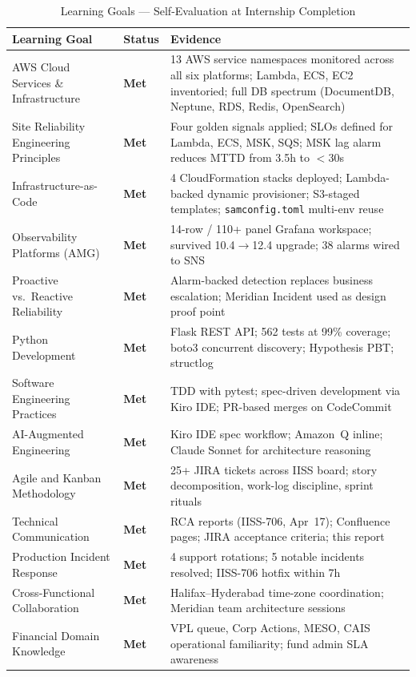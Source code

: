 \begin{table}[ht]
\centering
\caption{Learning Goals --- Self-Evaluation at Internship Completion}
\label{tab:learning_goals_eval}
\begin{tabular}{p{5.2cm}p{2.2cm}p{5.0cm}}
\toprule
\textbf{Learning Goal} & \textbf{Status} & \textbf{Evidence} \\
\midrule
AWS Cloud Services \& Infrastructure & \textcolor{smumaroon}{\textbf{Met}} & 13 AWS service namespaces monitored across all six platforms; Lambda, ECS, EC2 inventoried; full DB spectrum (DocumentDB, Neptune, RDS, Redis, OpenSearch) \\
\midrule
Site Reliability Engineering Principles & \textcolor{smumaroon}{\textbf{Met}} & Four golden signals applied; SLOs defined for Lambda, ECS, MSK, SQS; MSK lag alarm reduces MTTD from 3.5h to $<$30s \\
\midrule
Infrastructure-as-Code & \textcolor{smumaroon}{\textbf{Met}} & 4 CloudFormation stacks deployed; Lambda-backed dynamic provisioner; S3-staged templates; \texttt{samconfig.toml} multi-env reuse \\
\midrule
Observability Platforms (AMG) & \textcolor{smumaroon}{\textbf{Met}} & 14-row / 110+ panel Grafana workspace; survived 10.4$\to$12.4 upgrade; 38 alarms wired to SNS \\
\midrule
Proactive vs.\ Reactive Reliability & \textcolor{smumaroon}{\textbf{Met}} & Alarm-backed detection replaces business escalation; Meridian Incident used as design proof point \\
\midrule
Python Development & \textcolor{smumaroon}{\textbf{Met}} & Flask REST API; 562 tests at 99\% coverage; boto3 concurrent discovery; Hypothesis PBT; structlog \\
\midrule
Software Engineering Practices & \textcolor{smumaroon}{\textbf{Met}} & TDD with pytest; spec-driven development via Kiro IDE; PR-based merges on CodeCommit \\
\midrule
AI-Augmented Engineering & \textcolor{smumaroon}{\textbf{Met}} & Kiro IDE spec workflow; Amazon~Q inline; Claude Sonnet for architecture reasoning \\
\midrule
Agile and Kanban Methodology & \textcolor{smumaroon}{\textbf{Met}} & 25+ JIRA tickets across IISS board; story decomposition, work-log discipline, sprint rituals \\
\midrule
Technical Communication & \textcolor{smumaroon}{\textbf{Met}} & RCA reports (IISS-706, Apr~17); Confluence pages; JIRA acceptance criteria; this report \\
\midrule
Production Incident Response & \textcolor{smumaroon}{\textbf{Met}} & 4 support rotations; 5 notable incidents resolved; IISS-706 hotfix within 7h \\
\midrule
Cross-Functional Collaboration & \textcolor{smumaroon}{\textbf{Met}} & Halifax--Hyderabad time-zone coordination; Meridian team architecture sessions \\
\midrule
Financial Domain Knowledge & \textcolor{smumaroon}{\textbf{Met}} & VPL queue, Corp Actions, MESO, CAIS operational familiarity; fund admin SLA awareness \\
\bottomrule
\end{tabular}
\end{table}

